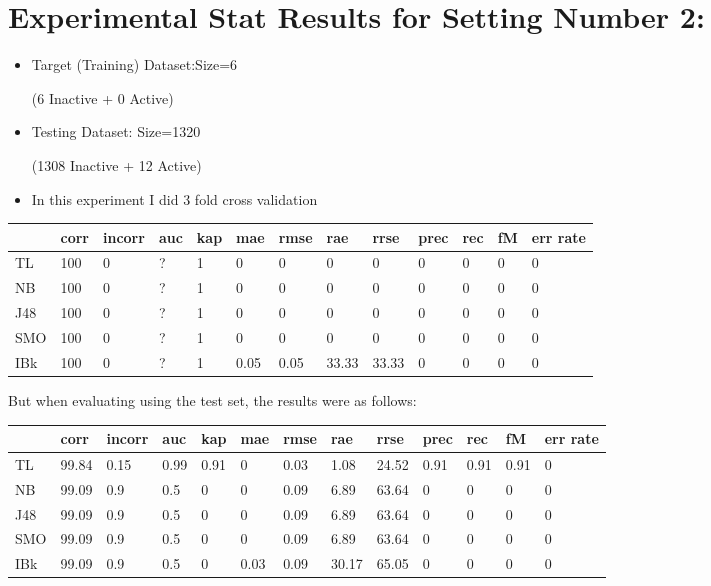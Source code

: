 \documentclass[a4paper,12pt, english]{article}
\begin{document}
\section{Experimental Stat Results for Setting Number 2:}
\begin{itemize}
\item Target (Training) Dataset:Size=6 \begin{scriptsize}(6 Inactive + 0 Active)\end{scriptsize}
\item Testing Dataset: Size=1320 \begin{scriptsize}(1308 Inactive + 12 Active)\end{scriptsize}
\item In this experiment I did 3 fold cross validation
\end{itemize}  
\begin{small}
\begin{center}
    \begin{tabular}{ | l | l | l | l | l | l | l | l | l | l | l | l | l |}
    \hline
      	& corr & incorr  & auc & kap & mae & rmse & rae & rrse & prec & rec & fM & err rate\\ \hline
      	TL & 100 & 0 & ? & 1 & 0 & 0 & 0 & 0 & 0 & 0 & 0 & 0\\ \hline
	NB & 100 & 0 & ? & 1 & 0 & 0 & 0 & 0 & 0 & 0 & 0 & 0\\ \hline
	J48 & 100 & 0 & ? & 1 & 0 & 0 & 0 & 0 & 0 & 0 & 0 & 0\\ \hline
	SMO & 100 & 0 & ? & 1 & 0 & 0 & 0 & 0 & 0 & 0 & 0 & 0\\ \hline
	IBk & 100 & 0 & ? & 1 & 0.05 & 0.05 & 33.33 & 33.33 & 0 & 0 & 0 & 0\\ \hline  
    \end{tabular}       
\end{center}
\end{small}

But when evaluating using the test set, the results were as follows:
\begin{small}
\begin{center}
    \begin{tabular}{ | l | l | l | l | l | l | l | l | l | l | l | l | l |}
    \hline
      	& corr & incorr  & auc & kap & mae & rmse & rae & rrse & prec & rec & fM & err rate\\ \hline
      	TL & 99.84 & 0.15 & 0.99 & 0.91 & 0 & 0.03 & 1.08 & 24.52 & 0.91 & 0.91 & 0.91 & 0\\ \hline
	NB & 99.09 & 0.9 & 0.5 & 0 & 0 & 0.09 & 6.89 & 63.64 & 0 & 0 & 0 & 0\\ \hline
	J48 & 99.09 & 0.9 & 0.5 & 0 & 0 & 0.09 & 6.89 & 63.64 & 0 & 0 & 0 & 0\\ \hline
	SMO & 99.09 & 0.9 & 0.5 & 0 & 0 & 0.09 & 6.89 & 63.64 & 0 & 0 & 0 & 0\\ \hline
	IBk & 99.09 & 0.9 & 0.5 & 0 & 0.03 & 0.09 & 30.17 & 65.05 & 0 & 0 & 0 & 0\\ \hline  
    \end{tabular}       
\end{center}
\end{small}
\end{document}
